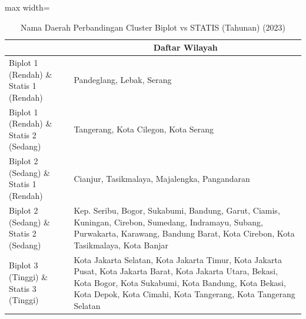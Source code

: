 \begin{table}[H]
\centering
\caption{Nama Daerah Perbandingan Cluster Biplot vs STATIS (Tahunan) (2023)} \label{tab:app2biplot_statis_comp_name_2023}
\begin{adjustbox}{max width=\textwidth}
\begin{tabular}{|>{\centering\arraybackslash}p{4cm}|p{10cm}|}
\hline
\multicolumn{1}{|c|}{\textbf{Kategori}} & \multicolumn{1}{c|}{\textbf{Daftar Wilayah}} \\
\hline
Biplot 1 (Rendah) \& Statis 1 (Rendah) & Pandeglang, Lebak, Serang \\
\hline
Biplot 1 (Rendah) \& Statis 2 (Sedang) & Tangerang, Kota Cilegon, Kota Serang \\
\hline
Biplot 2 (Sedang) \& Statis 1 (Rendah) & Cianjur, Tasikmalaya, Majalengka, Pangandaran \\
\hline
Biplot 2 (Sedang) \& Statis 2 (Sedang) & Kep. Seribu, Bogor, Sukabumi, Bandung, Garut, Ciamis, Kuningan, Cirebon, Sumedang, Indramayu, Subang, Purwakarta, Karawang, Bandung Barat, Kota Cirebon, Kota Tasikmalaya, Kota Banjar \\
\hline
Biplot 3 (Tinggi) \& Statis 3 (Tinggi) & Kota Jakarta Selatan, Kota Jakarta Timur, Kota Jakarta Pusat, Kota Jakarta Barat, Kota Jakarta Utara, Bekasi, Kota Bogor, Kota Sukabumi, Kota Bandung, Kota Bekasi, Kota Depok, Kota Cimahi, Kota Tangerang, Kota Tangerang Selatan \\
\hline
\end{tabular}
\end{adjustbox}
\end{table}